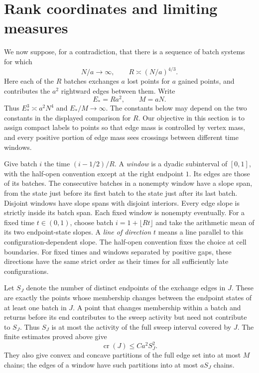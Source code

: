 \section{Rank coordinates and limiting measures}\label{sec:rank-limits}
We now suppose, for a contradiction, that there is a sequence of batch
systems for which
\[
 N/a\longrightarrow\infty,\qquad R\asymp(N/a)^{4/3}.
\]
Here each of the $R$ batches exchanges $a$ lost points for $a$ gained
points, and contributes the $a^2$ rightward edges between them.  Write
\[
 E_*=Ra^2,\qquad M=aN.
\]
Thus $E_*^3\asymp a^2N^4$ and $E_*/M\to\infty$.  The constants below may
depend on the two constants in the displayed comparison for $R$.
Our objective in this section is to assign compact labels to points so
that edge mass is controlled by vertex mass, and every positive portion
of edge mass sees crossings between different time windows.

Give batch $i$ the time $(i-1/2)/R$.  A \emph{window} is a dyadic
subinterval of $[0,1]$, with the half-open convention except at the right
endpoint $1$.  Its edges are those of its batches.  The consecutive
batches in a nonempty window have a slope span, from the state just
before its first batch to the state just after its last batch.  Disjoint
windows have slope spans with disjoint interiors.  Every edge slope is
strictly inside its batch span.  Each fixed window is nonempty eventually.
For a fixed time $t\in(0,1)$, choose batch $i=1+\lfloor Rt\rfloor$
and take the arithmetic mean of its two endpoint-state slopes.
A \emph{line of direction $t$} means a line parallel to this
configuration-dependent slope. The half-open convention fixes the
choice at cell boundaries. For fixed times and windows separated by
positive gaps, these directions have the same strict order as their
times for all sufficiently late configurations.

Let $S_J$ denote the number of distinct endpoints of the exchange edges
in $J$. These are exactly the points whose membership changes between
the endpoint states of at least one batch in $J$. A point that changes
membership within a batch and returns before its end contributes to
the sweep activity but need not contribute to $S_J$. Thus $S_J$ is
at most the activity of the full sweep interval covered by $J$.
The finite estimates proved above give
\begin{equation}\label{eq:finite-window-crossings}
 \operatorname{cr}(J)\le C a^2S_J^2.
\end{equation}
They also give convex and concave partitions of the full edge set into
at most $M$ chains; the edges of a window have such partitions into at
most $aS_J$ chains.

